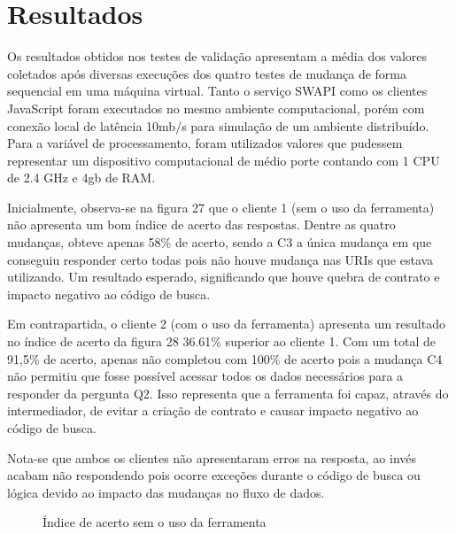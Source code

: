 \section{Resultados}

Os resultados obtidos nos testes de validação apresentam a média dos valores coletados após diversas execuções dos quatro testes de mudança de forma sequencial em uma máquina virtual. Tanto o serviço SWAPI como os clientes JavaScript foram executados no mesmo ambiente computacional, porém com conexão local de latência 10mb/s para simulação de um ambiente distribuído. Para a variável de processamento, foram utilizados valores que pudessem representar um dispositivo computacional de médio porte contando com 1 CPU de 2.4 GHz e 4gb de RAM.

Inicialmente, observa-se na figura 27 que o cliente 1 (sem o uso da ferramenta) não apresenta um bom índice de acerto das respostas. Dentre as quatro mudanças, obteve apenas 58\% de acerto, sendo a C3 a única mudança em que conseguiu responder certo todas pois não houve mudança nas URIs que estava utilizando. Um resultado esperado, significando que houve quebra de contrato e impacto negativo ao código de busca.

Em contrapartida, o cliente 2 (com o uso da ferramenta) apresenta um resultado no índice de acerto da figura 28 36.61\% superior ao cliente 1. Com um total de 91,5\% de acerto, apenas não completou com 100\% de acerto pois a mudança C4 não permitiu que fosse possível acessar todos os dados necessários para a responder da pergunta Q2. Isso representa que a ferramenta foi capaz, através do intermediador, de evitar a criação de contrato e causar impacto negativo ao código de busca.

Nota-se que ambos os clientes não apresentaram erros na resposta, ao invés acabam não respondendo pois ocorre exceções durante o código de busca ou lógica devido ao impacto das mudanças no fluxo de dados.

\begin{figure}[H]
  \centering
  \caption{Índice de acerto sem o uso da ferramenta}
\end{figure}

